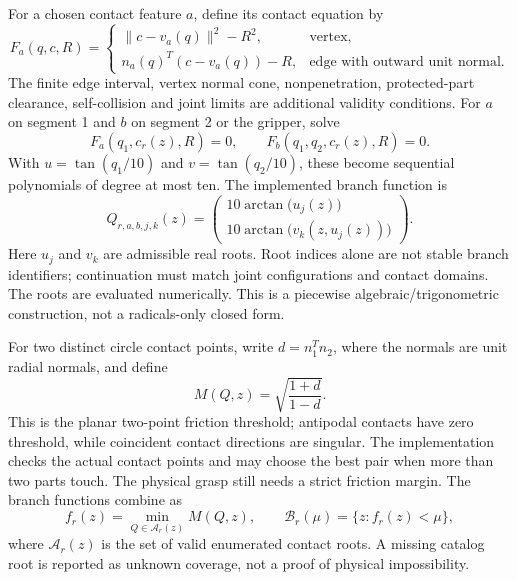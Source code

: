 \documentclass[11pt]{article}
\begin{document}
For a chosen contact feature $a$, define its contact equation by
\[
 F_a(q,c,R)=
 \begin{cases}
 \|c-v_a(q)\|^2-R^2,&\text{vertex},\\
 n_a(q)^T(c-v_a(q))-R,&\text{edge with outward unit normal}.
 \end{cases}
\]
The finite edge interval, vertex normal cone, nonpenetration, protected-part
clearance, self-collision and joint limits are additional validity conditions.
For $a$ on segment 1 and $b$ on segment 2 or the gripper, solve
\[
 F_a(q_1,c_r(z),R)=0,\qquad F_b(q_1,q_2,c_r(z),R)=0.
\]
With $u=\tan(q_1/10)$ and $v=\tan(q_2/10)$, these become sequential polynomials
of degree at most ten. The implemented branch function is
\[
 Q_{r,a,b,j,k}(z)=
 \begin{pmatrix}
 10\arctan\bigl(u_j(z)\bigr)\\
 10\arctan\bigl(v_k(z,u_j(z))\bigr)
 \end{pmatrix}.
\]
Here $u_j$ and $v_k$ are admissible real roots. Root indices alone are not stable
branch identifiers; continuation must match joint configurations and contact domains.
The roots are evaluated numerically. This is a piecewise algebraic/trigonometric
construction, not a radicals-only closed form.

For two distinct circle contact points, write $d=n_1^Tn_2$, where the normals
are unit radial normals, and define
\[
 M(Q,z)=\sqrt{\frac{1+d}{1-d}}.
\]
This is the planar two-point friction threshold; antipodal contacts have zero
threshold, while coincident contact directions are singular. The implementation
checks the actual contact points and may choose the best pair when more than two
parts touch. The physical grasp still needs a strict friction margin.
The branch functions combine as
\[
 f_r(z)=\min_{Q\in\mathcal A_r(z)} M(Q,z),\qquad
 \mathcal B_r(\mu)=\{z:f_r(z)<\mu\},
\]
where $\mathcal A_r(z)$ is the set of valid enumerated contact roots. A missing
catalog root is reported as unknown coverage, not a proof of physical impossibility.
\end{document}
